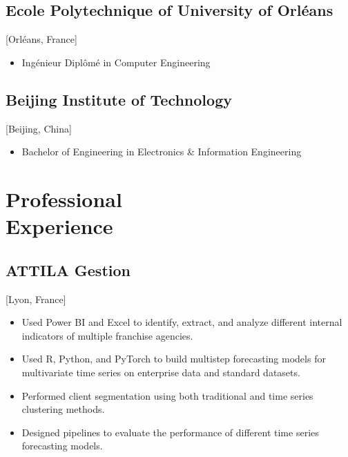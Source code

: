 \documentclass{mycv}
\begin{document}
\subsection{Ecole Polytechnique of University of Orl\'eans}[Orl\'eans, France]
\begin{itemize}[label={}]
  \item Ing\'enieur Dipl\^om\'e in Computer Engineering 
\end{itemize}

\subsection{Beijing Institute of Technology}[Beijing, China]
\begin{itemize}[label={}]
  \item Bachelor of Engineering in Electronics \& Information Engineering 
\end{itemize}

\section{Professional \\ Experience}

\subsection{ATTILA Gestion}[Lyon, France]

\begin{positions}
\end{positions}

\begin{itemize}
  \item Used Power BI and Excel to identify, extract, and analyze different internal indicators of multiple franchise agencies.
  \item Used R, Python, and PyTorch to build multistep forecasting models for multivariate time series on enterprise data and standard datasets.
  \item Performed client segmentation using both traditional and time series clustering methods.
  \item Designed pipelines to evaluate the performance of different time series forecasting models.
\end{itemize}
\end{document}
